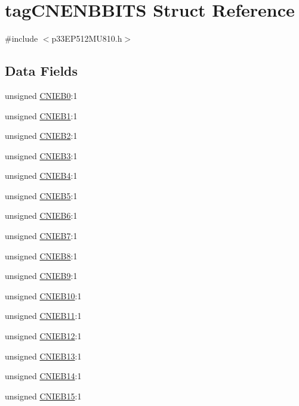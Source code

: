 \hypertarget{structtag_c_n_e_n_b_b_i_t_s}{}\section{tag\+C\+N\+E\+N\+B\+B\+I\+TS Struct Reference}
\label{structtag_c_n_e_n_b_b_i_t_s}


{\ttfamily \#include $<$p33\+E\+P512\+M\+U810.\+h$>$}

\subsection*{Data Fields}
\begin{DoxyCompactItemize}
\item 
unsigned \hyperlink{structtag_c_n_e_n_b_b_i_t_s_ad7394497fe27a23af754ece5970fba49}{C\+N\+I\+E\+B0}\+:1
\item 
unsigned \hyperlink{structtag_c_n_e_n_b_b_i_t_s_aa6045fb9434b34bf559e6ce0615200fd}{C\+N\+I\+E\+B1}\+:1
\item 
unsigned \hyperlink{structtag_c_n_e_n_b_b_i_t_s_a4cde6e7bec006a40505fcc28c98eaa9d}{C\+N\+I\+E\+B2}\+:1
\item 
unsigned \hyperlink{structtag_c_n_e_n_b_b_i_t_s_ae2e9ce8a68db958f7883e1fd1f7a97ba}{C\+N\+I\+E\+B3}\+:1
\item 
unsigned \hyperlink{structtag_c_n_e_n_b_b_i_t_s_a2f7188bb03cd1941b17c97db5cc5aa10}{C\+N\+I\+E\+B4}\+:1
\item 
unsigned \hyperlink{structtag_c_n_e_n_b_b_i_t_s_afe1372ec322bd008c0dec3d74bfa2258}{C\+N\+I\+E\+B5}\+:1
\item 
unsigned \hyperlink{structtag_c_n_e_n_b_b_i_t_s_aeaf6e8e6518832308b0383bfe1c23ad2}{C\+N\+I\+E\+B6}\+:1
\item 
unsigned \hyperlink{structtag_c_n_e_n_b_b_i_t_s_ae07950d870794d8f7cc5e3782cc3a4b8}{C\+N\+I\+E\+B7}\+:1
\item 
unsigned \hyperlink{structtag_c_n_e_n_b_b_i_t_s_a704e3c28f5ce0980ab1f3576dacda2a8}{C\+N\+I\+E\+B8}\+:1
\item 
unsigned \hyperlink{structtag_c_n_e_n_b_b_i_t_s_ad4797c430e4d24c055bc467b37855fef}{C\+N\+I\+E\+B9}\+:1
\item 
unsigned \hyperlink{structtag_c_n_e_n_b_b_i_t_s_a5d4f30c63e173518e4c3ad969215a7c5}{C\+N\+I\+E\+B10}\+:1
\item 
unsigned \hyperlink{structtag_c_n_e_n_b_b_i_t_s_a50a3543f6d8c5a56aacd16db030fccfb}{C\+N\+I\+E\+B11}\+:1
\item 
unsigned \hyperlink{structtag_c_n_e_n_b_b_i_t_s_a5513de4b585e2d14bb2a9be2ea125e14}{C\+N\+I\+E\+B12}\+:1
\item 
unsigned \hyperlink{structtag_c_n_e_n_b_b_i_t_s_aa7457d037382864861ca82920374f143}{C\+N\+I\+E\+B13}\+:1
\item 
unsigned \hyperlink{structtag_c_n_e_n_b_b_i_t_s_a5febafe2442e968959eb194e8bd4b28b}{C\+N\+I\+E\+B14}\+:1
\item 
unsigned \hyperlink{structtag_c_n_e_n_b_b_i_t_s_a549fd07be83e4fa60efae320ebc3f1cf}{C\+N\+I\+E\+B15}\+:1
\end{DoxyCompactItemize}


